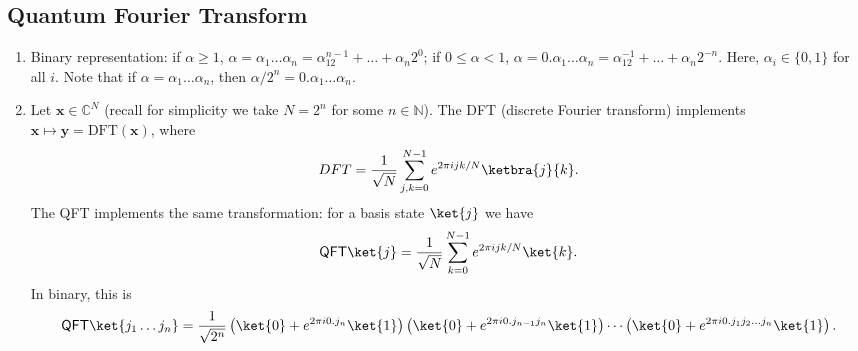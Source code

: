\subsection{Quantum Fourier Transform}
\begin{enumerate}
    \item Binary representation: if $\alpha \geq 1$, $\alpha = \alpha_1\dots\alpha_n = \alpha_12^{n-1}+\dots+\alpha_n2^0$; if $0 \leq \alpha < 1$, $\alpha = 0.\alpha_1\dots\alpha_n = \alpha_12^{-1}+\dots+\alpha_n2^{-n}$. Here, $\alpha_i \in\{0,1\}$ for all $i$. Note that if $\alpha = \alpha_1\dots\alpha_n$, then $\alpha/2^n = 0.\alpha_1\dots\alpha_n$.
    
    \item Let $\mathbf{x}\in \mathbb{C}^N$ (recall for simplicity we take $N=2^n$ for some $n \in \mathbb{N}$). The DFT (discrete Fourier transform) implements $\mathbf{x} \mapsto \mathbf{y}=\text{DFT}(\mathbf{x})$, where
    \begin{align*}
        DFT = \frac{1}{\sqrt{N}} \sum_{j,k=0}^{N-1} e^{2\pi ijk/N} \ketbra{j}{k}.
    \end{align*}
    The QFT implements the same transformation: for a basis state $\ket{j}$ we have
    \begin{align*}
        \mathsf{QFT}\ket{j} = \frac{1}{\sqrt{N}} \sum_{k=0}^{N-1} e^{2\pi ijk/N} \ket{k}.
    \end{align*}
    In binary, this is
    \begin{align*}
        \mathsf{QFT}\ket{j_1\dots j_n} = \frac{1}{\sqrt{2^n}}\left( \ket{0}+e^{2\pi i0.j_n}\ket{1} \right)\left( \ket{0}+e^{2\pi i0.j_{n-1}j_n}\ket{1} \right)\cdots \left( \ket{0}+e^{2\pi i0.j_1j_2\dots j_n}\ket{1}\right).
    \end{align*}
    

\end{enumerate}
